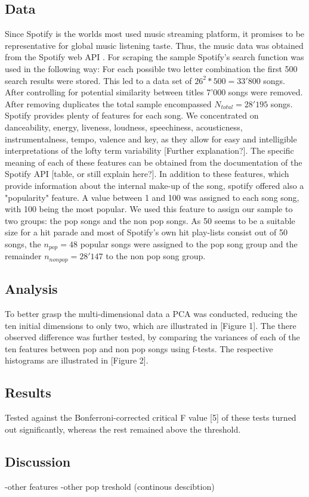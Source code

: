 \documentclass{article}
\begin{document}
\subsection{Data}
Since Spotify is the worlds most used music streaming platform, it promises to be representative for global music listening taste. Thus, the music data was obtained from the Spotify web API \citep{spotify}. For scraping the sample Spotify's search function was used in the following way: For each possible two letter combination the first 500 search results were stored. This led to a data set of \(26^{2} * 500 = 33'800\) songs. After controlling for potential similarity between titles 7'000 songs were removed. After removing duplicates the total sample encompassed \(N_{total} = 28'195\)  songs. 
Spotify provides plenty of features for each song. We concentrated 
on danceability, energy, liveness, loudness, speechiness, acousticness, instrumentalness, tempo, valence and key, as they allow for easy and intelligible  interpretations of the lofty term variability [Further explanation?]. The specific meaning of each of these features can be obtained from the documentation of the Spotify API \citep{spotifyAPIdocu}[table, or still explain here?]. In addition to these features, which provide information about the internal make-up of the song, spotify offered also a "popularity" feature. A value between 1 and 100 was assigned to each song song, with 100 being the most popular. We used this feature to assign our sample to two groups: the pop songs and the non pop songs. As 50 seems to be a suitable size for a hit parade and most of Spotify's own hit play-lists consist out of 50 songs, the \(n_{pop} = 48\) popular songs were assigned to the pop song group and the remainder \(n_{non pop} = 28'147\) to the non pop song group. 

\subsection{Analysis}
To better grasp the multi-dimensional data a PCA was conducted, reducing the ten initial dimensions to only two, which are illustrated in [Figure 1]. The there observed difference was further tested, by comparing the variances of each of the ten features between pop and non pop songs using f-tests. The respective histograms are illustrated in [Figure 2]. 

\subsection{Results}
Tested against the Bonferroni-corrected critical F value [5] of these tests turned out significantly, whereas the rest remained above the threshold. 

\subsection{Discussion}
-other features
-other pop treshold (continous descibtion)


\end{document}
